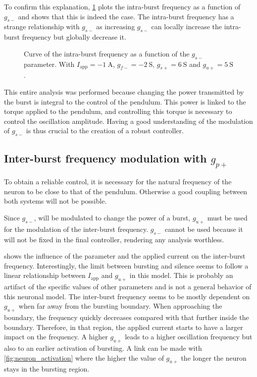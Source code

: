 To confirm this explanation, \cref{fig:neuron_burst_intra} plots the intra-burst frequency as a function of $g_{s-}$ and shows that this is indeed the case.
The intra-burst frequency has a strange relationship with $g_{s-}$ as increasing $g_{s-}$ can locally increase the intra-burst frequency but globally decrease it.

\begin{figure}[!htb]
    \centering
    \caption{Curve of the intra-burst frequency as a function of the $g_{s-}$ parameter. With $I_\text{app} = \qty{-1}{\ampere}$, $g_{f-} = \qty{-2}{\siemens}$, $g_{s+} = \qty{6}{\siemens}$ and $g_{u+} = \qty{5}{\siemens}$.}
    \label{fig:neuron_burst_intra}
\end{figure}

This entire analysis was performed because changing the power transmitted by the burst is integral to the control of the pendulum.
This power is linked to the torque applied to the pendulum, and controlling this torque is necessary to control the oscillation amplitude.
Having a good understanding of the modulation of $g_{s-}$ is thus crucial to the creation of a robust controller.

\subsection{Inter-burst frequency modulation with $g_{p+}$}

To obtain a reliable control, it is necessary for the natural frequency of the neuron to be close to that of the pendulum.
Otherwise a good coupling between both systems will not be possible.

Since $g_{s-}$, will be modulated to change the power of a burst, $g_{u+}$ must be used for the modulation of the inter-burst frequency.
$g_{s-}$ cannot be used because it will not be fixed in the final controller, rendering any analysis worthless.

 shows the influence of the parameter and the applied current on the inter-burst frequency.
Interestingly, the limit between bursting and silence seems to follow a linear relationship between $I_\text{app}$ and $g_{u+}$ in this model.
This is probably an artifact of the specific values of other parameters and is not a general behavior of this neuronal model.
The inter-burst frequency seems to be mostly dependent on $g_{u+}$ when far away from the bursting boundary.
When approaching the boundary, the frequency quickly decreases compared with that further inside the boundary.
Therefore, in that region, the applied current starts to have a larger impact on the frequency.
A higher $g_{u+}$ leads to a higher oscillation frequency but also to an earlier activation of bursting.
A link can be made with \cref{fig:neuron_activation} where the higher the value of $g_{u+}$ the longer the neuron stays in the bursting region.

